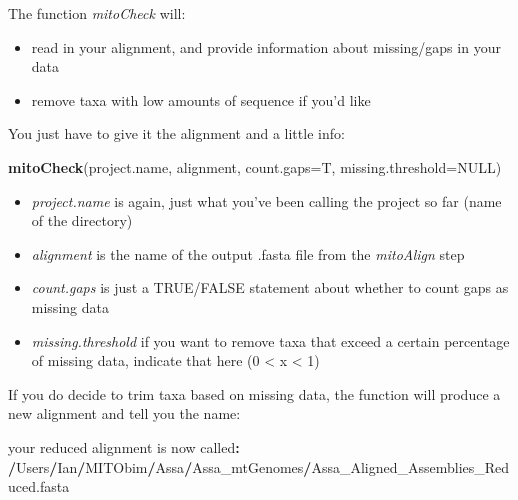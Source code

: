 \documentclass[]{article}
\newenvironment{Shaded}{\begin{snugshade}}{\end{snugshade}}
\newcommand{\DataTypeTok}[1]{\textcolor[rgb]{0.13,0.29,0.53}{#1}}
\newcommand{\ErrorTok}[1]{\textcolor[rgb]{0.64,0.00,0.00}{\textbf{#1}}}
\newcommand{\KeywordTok}[1]{\textcolor[rgb]{0.13,0.29,0.53}{\textbf{#1}}}
\newcommand{\NormalTok}[1]{#1}
\newcommand{\OperatorTok}[1]{\textcolor[rgb]{0.81,0.36,0.00}{\textbf{#1}}}
\newcommand{\OtherTok}[1]{\textcolor[rgb]{0.56,0.35,0.01}{#1}}
\providecommand{\tightlist}{%
  \setlength{\itemsep}{0pt}\setlength{\parskip}{0pt}}
\begin{document}
The function \emph{mitoCheck} will:

\begin{itemize}
\tightlist
\item
  read in your alignment, and provide information about missing/gaps in
  your data\\
\item
  remove taxa with low amounts of sequence if you'd like
\end{itemize}

You just have to give it the alignment and a little info:

\begin{Shaded}
\begin{Highlighting}[]
\KeywordTok{mitoCheck}\NormalTok{(project.name, alignment, }\DataTypeTok{count.gaps=}\NormalTok{T, }\DataTypeTok{missing.threshold=}\OtherTok{NULL}\NormalTok{)}
\end{Highlighting}
\end{Shaded}

\begin{itemize}
\tightlist
\item
  \emph{project.name} is again, just what you've been calling the
  project so far (name of the directory)\\
\item
  \emph{alignment} is the name of the output .fasta file from the
  \emph{mitoAlign} step\\
\item
  \emph{count.gaps} is just a TRUE/FALSE statement about whether to
  count gaps as missing data\\
\item
  \emph{missing.threshold} if you want to remove taxa that exceed a
  certain percentage of missing data, indicate that here (0 \textless{}
  x \textless{} 1)
\end{itemize}

If you do decide to trim taxa based on missing data, the function will
produce a new alignment and tell you the name:

\begin{Shaded}
\begin{Highlighting}[]
\NormalTok{your reduced alignment is now called}\OperatorTok{:}
\ErrorTok{/}\NormalTok{Users}\OperatorTok{/}\NormalTok{Ian}\OperatorTok{/}\NormalTok{MITObim}\OperatorTok{/}\NormalTok{Assa}\OperatorTok{/}\NormalTok{Assa_mtGenomes}\OperatorTok{/}\NormalTok{Assa_Aligned_Assemblies_Reduced.fasta}
\end{Highlighting}
\end{Shaded}
\end{document}

